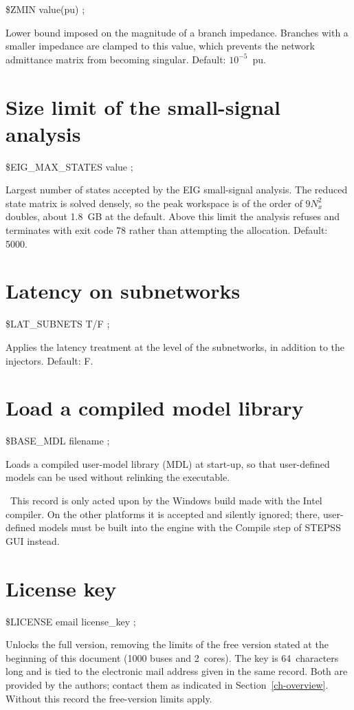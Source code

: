  \$ZMIN value(pu) ;

Lower bound imposed on the magnitude of a branch impedance. Branches with a
smaller impedance are clamped to this value, which prevents the network
admittance matrix from becoming singular. Default: $10^{-5}$~pu.


\section{Size limit of the small-signal
analysis}

 \$EIG\_MAX\_STATES value ;

Largest number of states accepted by the EIG small-signal analysis. The reduced
state matrix is solved densely, so the peak workspace is of the order of
$9N_x^2$ doubles, about 1.8~GB at the default. Above this limit the analysis
refuses and terminates with exit code 78 rather than attempting the allocation.
Default: 5000.


\section{Latency on subnetworks}

 \$LAT\_SUBNETS T/F ;

Applies the latency treatment at the level of the subnetworks, in addition to
the injectors. Default: F.


\section{Load a compiled model library}

 \$BASE\_MDL filename ;

Loads a compiled user-model library (MDL) at start-up, so that user-defined
models can be used without relinking the executable.

\faHandPointRight~This record is only acted upon by the Windows build made with
the Intel compiler. On the other platforms it is accepted and silently ignored;
there, user-defined models must be built into the engine with the Compile step of STEPSS GUI instead.


\section{License key}

 \$LICENSE email license\_key ;

Unlocks the full version, removing the limits of the free version stated at the
beginning of this document (1000 buses and 2~cores). The key is 64~characters
long and is tied to the electronic mail address given in the same record. Both
are provided by the authors; contact them as indicated in Section~\ref{ch-overview}.
Without this record the free-version limits apply.